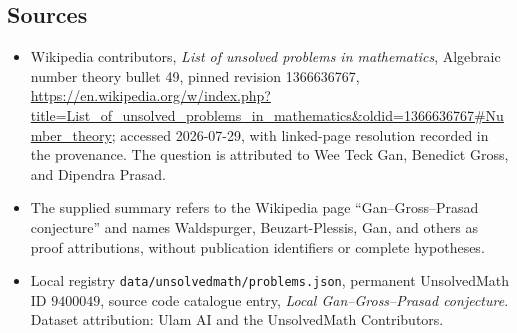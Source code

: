\documentclass[11pt]{article}
\begin{document}
\subsection{Sources}
\begin{itemize}
\item Wikipedia contributors, \emph{List of unsolved problems in mathematics}, Algebraic number theory bullet 49, pinned revision 1366636767, \url{https://en.wikipedia.org/w/index.php?title=List_of_unsolved_problems_in_mathematics&oldid=1366636767#Number_theory}; accessed 2026-07-29, with linked-page resolution recorded in the provenance. The question is attributed to Wee Teck Gan, Benedict Gross, and Dipendra Prasad.
\item The supplied summary refers to the Wikipedia page ``Gan--Gross--Prasad conjecture'' and names Waldspurger, Beuzart-Plessis, Gan, and others as proof attributions, without publication identifiers or complete hypotheses.
\item Local registry \texttt{data/unsolvedmath/problems.json}, permanent UnsolvedMath ID $9400049$, source code catalogue entry, \emph{Local Gan--Gross--Prasad conjecture}. Dataset attribution: Ulam AI and the UnsolvedMath Contributors.
\end{itemize}
\end{document}
